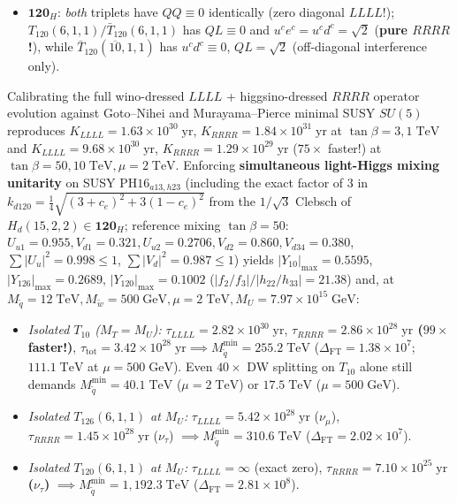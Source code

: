 \documentclass[11pt,a4paper]{article}
\begin{document}
\begin{enumerate}
\begin{itemize}
        \item $\mathbf{120}_H$: \emph{both} triplets have $QQ \equiv 0$ identically (zero diagonal $LLLL$!); $T_{120}(6,1,1)/\bar T_{120}(6,1,1)$ has $QL \equiv 0$ and $u^c e^c = u^c d^c = \sqrt{2}$ (\textbf{pure $RRRR$!}), while $\bar T_{120}(\overline{10},1,1)$ has $u^c d^c \equiv 0$, $QL = \sqrt{2}$ (off-diagonal interference only).
    \end{itemize}
    Calibrating the full wino-dressed $LLLL$ + higgsino-dressed $RRRR$ operator evolution against Goto--Nihei \cite{GotoNihei1999} and Murayama--Pierce \cite{Murayama2002} minimal SUSY $SU(5)$ reproduces $K_{LLLL} = 1.63\times 10^{30}\;\mathrm{yr}$, $K_{RRRR} = 1.84\times 10^{31}\;\mathrm{yr}$ at $\tan\beta=3, 1\;\mathrm{TeV}$ and $K_{LLLL} = 9.68\times 10^{30}\;\mathrm{yr}$, $K_{RRRR} = 1.29\times 10^{29}\;\mathrm{yr}$ ($75\times$ faster!) at $\tan\beta=50, 10\;\mathrm{TeV}, \mu=2\;\mathrm{TeV}$. Enforcing \textbf{simultaneous light-Higgs mixing unitarity} on SUSY $\mathrm{PH16}_{a13,h23}$ (including the exact factor of $3$ in $k_{d120} = \frac{1}{4}\sqrt{(3+c_e)^2 + 3(1-c_e)^2}$ from the $1/\sqrt{3}$ Clebsch of $H_d(15,2,2)\in\mathbf{120}_H$; reference mixing $\tan\beta = 50$: $U_{u1}=0.955, V_{d1}=0.321, U_{u2}=0.2706, V_{d2}=0.860, V_{d34}=0.380$, $\sum|U_u|^2=0.998 \le 1$, $\sum|V_d|^2=0.987 \le 1$) yields $|Y_{10}|_{\max}=0.5595$, $|Y_{126}|_{\max}=0.2689$, $|Y_{120}|_{\max}=0.1002$ ($|f_2/f_3|/|h_{22}/h_{33}| = 21.38$) and, at $M_{\tilde q} = 12\;\mathrm{TeV}, M_{\tilde w} = 500\;\mathrm{GeV}, \mu = 2\;\mathrm{TeV}, M_U = 7.97\times 10^{15}\;\mathrm{GeV}$:
    \begin{itemize}
        \item \emph{Isolated $T_{10}$ ($M_T = M_U$):} $\tau_{LLLL} = 2.82\times 10^{30}\;\mathrm{yr}$, \textbf{$\tau_{RRRR} = 2.86\times 10^{28}\;\mathrm{yr}$ ($99\times$ faster!)}, $\tau_{\mathrm{tot}} = 3.42\times 10^{28}\;\mathrm{yr} \implies M_{\tilde q}^{\min} = 255.2\;\mathrm{TeV}$ ($\Delta_{\mathrm{FT}} = 1.38\times 10^7$; $111.1\;\mathrm{TeV}$ at $\mu = 500\;\mathrm{GeV}$). Even $40\times$ DW splitting on $T_{10}$ alone still demands $M_{\tilde q}^{\min} = 40.1\;\mathrm{TeV}$ ($\mu=2\;\mathrm{TeV}$) or $17.5\;\mathrm{TeV}$ ($\mu=500\;\mathrm{GeV}$).
        \item \emph{Isolated $T_{126}(6,1,1)$ at $M_U$:} $\tau_{LLLL} = 5.42\times 10^{28}\;\mathrm{yr}$ ($\nu_\mu$), $\tau_{RRRR} = 1.45\times 10^{28}\;\mathrm{yr}$ ($\nu_\tau$) $\implies M_{\tilde q}^{\min} = 310.6\;\mathrm{TeV}$ ($\Delta_{\mathrm{FT}} = 2.02\times 10^7$).
        \item \emph{Isolated $T_{120}(6,1,1)$ at $M_U$:} $\tau_{LLLL} = \infty$ (exact zero), \textbf{$\tau_{RRRR} = 7.10\times 10^{25}\;\mathrm{yr}$ ($\nu_\tau$)} $\implies M_{\tilde q}^{\min} = 1{,}192.3\;\mathrm{TeV}$ ($\Delta_{\mathrm{FT}} = 2.81\times 10^8$).

\end{itemize}
\end{enumerate}
\end{document}
